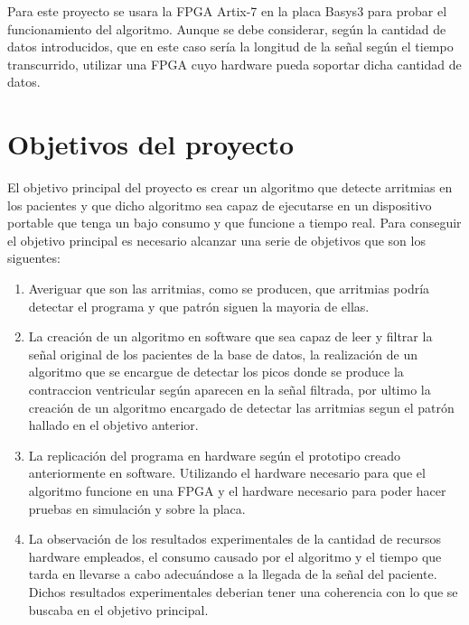 Para este proyecto se usara la FPGA Artix-7 en la placa Basys3 para probar el funcionamiento del algoritmo. Aunque se debe considerar, según
la cantidad de datos introducidos, que en este caso sería la longitud de la señal según el tiempo transcurrido, utilizar
una FPGA cuyo hardware pueda soportar dicha cantidad de datos.


\section{Objetivos del proyecto}

El objetivo principal del proyecto es crear un algoritmo que detecte arritmias en los pacientes y que dicho algoritmo sea capaz de ejecutarse en un dispositivo portable 
que tenga un bajo consumo y que funcione a tiempo real.
Para conseguir el objetivo principal es necesario alcanzar una serie de objetivos que son los siguentes:
\begin{enumerate}
	\item Averiguar que son las arritmias, como se producen, que arritmias podría detectar el programa y que patrón siguen la mayoria de ellas.

	\item La creación de un algoritmo en software que sea capaz de leer y filtrar la señal original de los pacientes de la base de datos, la realización de
	un algoritmo que se encargue de detectar los picos donde se produce la contraccion ventricular según aparecen en la señal filtrada, por ultimo la creación 
	de un algoritmo encargado de detectar las arritmias segun el patrón hallado en el objetivo anterior.
	
	\item La replicación del programa en hardware según el prototipo creado anteriormente en software. Utilizando el hardware necesario para que el algoritmo funcione en una FPGA 
	y el hardware necesario para poder hacer pruebas en simulación y sobre la placa.  

	\item La observación de los resultados experimentales de la cantidad de recursos hardware empleados, el consumo causado por el algoritmo y el tiempo que tarda en 
	llevarse a cabo adecuándose a la llegada de la señal del paciente. Dichos resultados experimentales deberian tener una coherencia con lo que se buscaba en el objetivo principal.
\end{enumerate}

